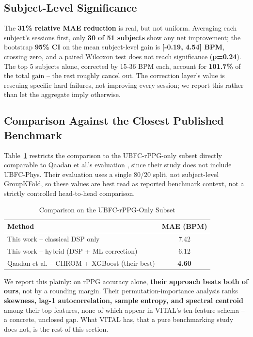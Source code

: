 \documentclass[conference]{IEEEtran}
\begin{document}
\subsection{\textbf{Subject-Level Significance}}
The \textbf{31\% relative MAE reduction} is real, but not uniform. Averaging each subject's sessions first, only \textbf{30 of 51 subjects} show any net improvement; the bootstrap \textbf{95\% CI} on the mean subject-level gain is \textbf{[-0.19, 4.54] BPM}, crossing zero, and a paired Wilcoxon test does not reach significance (\textbf{p=0.24}). The top 5 subjects alone, corrected by 15-36 BPM each, account for \textbf{101.7\%} of the total gain -- the rest roughly cancel out. The correction layer's value is rescuing specific hard failures, not improving every session; we report this rather than let the aggregate imply otherwise.

\subsection{\textbf{Comparison Against the Closest Published Benchmark}}
Table~\ref{tab:qaadan-compare} restricts the comparison to the UBFC-rPPG-only subset directly comparable to Qaadan et al.'s evaluation \cite{b_qaadan}, since their study does not include UBFC-Phys. Their evaluation uses a single 80/20 split, not subject-level GroupKFold, so these values are best read as reported benchmark context, not a strictly controlled head-to-head comparison.

\begin{table}[h]
\centering
\caption{Comparison on the UBFC-rPPG-Only Subset}
\label{tab:qaadan-compare}
\begin{tabular}{@{}lc@{}}
\toprule
\textbf{Method} & \textbf{MAE (BPM)} \\
\midrule
This work -- classical DSP only & 7.42 \\
This work -- hybrid (DSP + ML correction) & 6.12 \\
Qaadan et al. -- CHROM + XGBoost (their best) \cite{b_qaadan} & \textbf{4.60} \\
\bottomrule
\end{tabular}
\end{table}

We report this plainly: on rPPG accuracy alone, \textbf{their approach beats both of ours}, not by a rounding margin. Their permutation-importance analysis ranks \textbf{skewness, lag-1 autocorrelation, sample entropy, and spectral centroid} among their top features, none of which appear in VITAL's ten-feature schema -- a concrete, unclosed gap. What VITAL has, that a pure benchmarking study does not, is the rest of this section.
\end{document}
